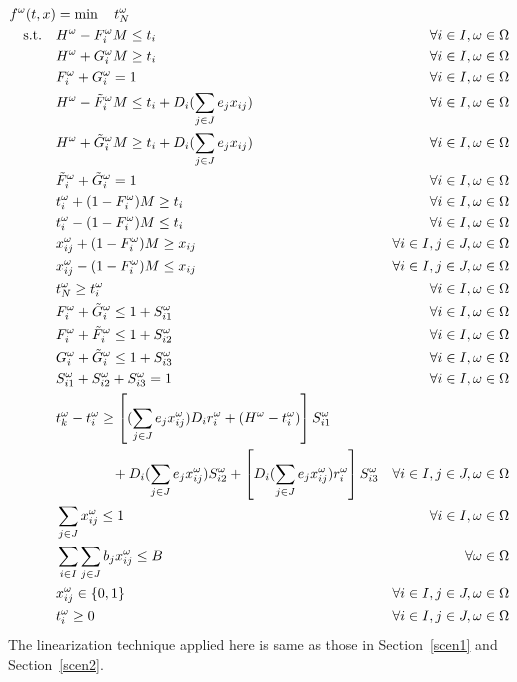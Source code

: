 \documentclass[11pt]{article}
\begin{document}
		\begin{align}
			f^\omega(t,x)& = \min \quad t_N^\omega &\\
			\text{s.t.} \quad & H^\omega - F_i^\omega M \leq t_i & \forall i \in I, \omega \in \Omega\\
			& H^\omega + G_i^\omega M \geq t_i & \forall i \in I, \omega \in \Omega\\
			& F_i^\omega + G_i^\omega = 1 & \forall i \in I, \omega \in \Omega \\
			& H^\omega - \tilde{F}_i^\omega M \leq t_i + D_i(\sum_{j \in J}e_jx_{ij}) & \forall i \in I, \omega \in \Omega\\
			& H^\omega + \tilde{G}_i^\omega M \geq t_i + D_i(\sum_{j \in J}e_jx_{ij}) & \forall i \in I, \omega \in \Omega\\
			& \tilde{F}_i^\omega + \tilde{G}_i^\omega = 1 & \forall i \in I, \omega \in \Omega \\
			& t_i^\omega + (1 - F_i^\omega)M \geq t_i & \forall i \in I, \omega \in \Omega\\
			& t_i^\omega - (1 - F_i^\omega)M \leq t_i & \forall i \in I, \omega \in \Omega\\
			& x_{ij}^\omega + (1 - F_i^\omega)M \geq x_{ij} & \forall i \in I, j \in J, \omega \in \Omega \\
			& x_{ij}^\omega - (1 - F_i^\omega)M \leq x_{ij} & \forall i \in I, j \in J, \omega \in \Omega \\
			& t_N^\omega \geq t_i^\omega & \forall i \in I, \omega \in \Omega\\
			& F_i^\omega + \tilde{G}_i^\omega \leq 1 + S_{i1}^\omega & \forall i \in I, \omega \in \Omega \\
			& F_i^\omega + \tilde{F}_i^\omega \leq 1 + S_{i2}^\omega & \forall i \in I, \omega \in \Omega \\
			& G_i^\omega + \tilde{G}_i^\omega \leq 1 + S_{i3}^\omega & \forall i \in I, \omega \in \Omega \\
			& S_{i1}^\omega + S_{i2}^\omega + S_{i3}^\omega = 1 & \forall i \in I, \omega \in \Omega \\
			& t_k^\omega - t_i^\omega \geq \left[(\sum_{j \in J} e_jx_{ij}^\omega) D_i r_i^\omega +(H^\omega - t_i^\omega) \right]S_{i1}^\omega & \notag \\&\qquad \qquad + D_i(\sum_{j \in J} e_jx_{ij}^\omega)S_{i2}^\omega + \left[D_i (\sum_{j \in J} e_j x_{ij}^\omega) r_i^\omega \right] S_{i3}^\omega & \forall i \in I, j \in J, \omega \in \Omega\\
			& \sum_{j \in J} x_{ij}^\omega \leq 1 & \forall i \in I, \omega \in \Omega\\
			& \sum_{i \in I}\sum_{j \in J} b_jx_{ij}^\omega \leq B & \forall \omega \in \Omega\\
			& x_{ij}^\omega \in \{0,1\} & \forall i \in I, j \in J, \omega \in \Omega\\
			& t_{i}^\omega \geq 0 & \forall i \in I, j \in J, \omega \in \Omega
		\end{align}
		The linearization technique applied here is same as those in Section~\ref{scen1} and Section~\ref{scen2}.
\end{document}
